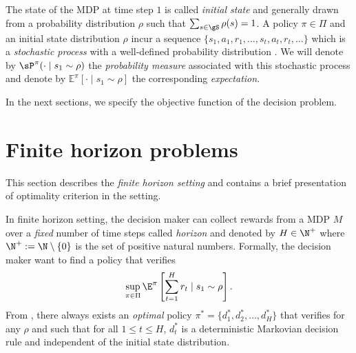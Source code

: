 The state of the MDP at time step $1$ is called \emph{initial state} and generally drawn from a probability distribution $\rho$ such that $\sum_{s\in\gS}\rho(s)=1$.
A policy $\pi\in\Pi$ and an initial state distribution $\rho$ incur a sequence $\{s_1,a_1,r_1,\dots,s_t,a_t,r_t,\dots\}$ which is a \emph{stochastic process} with a well-defined probability distribution \cite[Section~2.1.6]{puterman2014markov}.
We will denote by $\sP^\pi(\cdot\mid s_1\sim\rho)$ the \emph{probability measure} associated with this stochastic process and denote by $\mathbb{E}^\pi[\cdot \mid s_1\sim\rho]$ the corresponding \emph{expectation}.


In the next sections, we specify the objective function of the decision problem.


\section{Finite horizon problems}

This section describes the \emph{finite horizon setting} and contains a brief presentation of optimality criterion in the setting.

In finite horizon setting, the decision maker can collect rewards from a MDP $M$ over a \emph{fixed} number of time steps called \emph{horizon} and denoted by $H\in\N^+$ where $\N^+:=\N\setminus\{0\}$ is the set of positive natural numbers.
Formally, the decision maker want to find a policy that verifies
\begin{equation}
    \label{eq:finite_obj}
    \sup_{\pi\in\Pi}\E^\pi\left[\sum_{t=1}^H r_t\mid s_1\sim \rho\right].
\end{equation}
From \cite[Chapter~4]{puterman2014markov}, there always exists an \emph{optimal} policy $\pi^*=\{d_1^*,d_2^*,\dots,d^*_H\}$ that verifies  for any $\rho$ and such that for all $1\le t\le H$, $d_t^*$ is a deterministic Markovian decision rule and independent of the initial state distribution.

